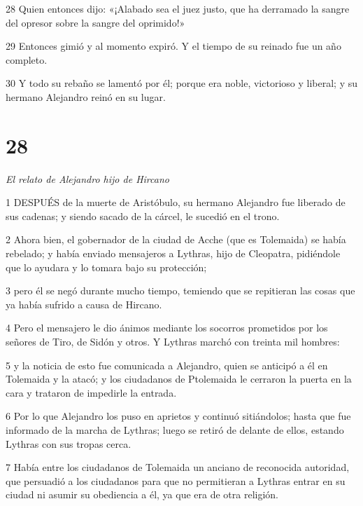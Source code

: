 \par 28 Quien entonces dijo: «¡Alabado sea el juez justo, que ha derramado la sangre del opresor sobre la sangre del oprimido!»

\par 29 Entonces gimió y al momento expiró. Y el tiempo de su reinado fue un año completo.

\par 30 Y todo su rebaño se lamentó por él; porque era noble, victorioso y liberal; y su hermano Alejandro reinó en su lugar.

\chapter{28}

\par \textit{El relato de Alejandro hijo de Hircano}

\par 1 DESPUÉS de la muerte de Aristóbulo, su hermano Alejandro fue liberado de sus cadenas; y siendo sacado de la cárcel, le sucedió en el trono.

\par 2 Ahora bien, el gobernador de la ciudad de Acche (que es Tolemaida) se había rebelado; y había enviado mensajeros a Lythras, hijo de Cleopatra, pidiéndole que lo ayudara y lo tomara bajo su protección;

\par 3 pero él se negó durante mucho tiempo, temiendo que se repitieran las cosas que ya había sufrido a causa de Hircano.

\par 4 Pero el mensajero le dio ánimos mediante los socorros prometidos por los señores de Tiro, de Sidón y otros. Y Lythras marchó con treinta mil hombres:

\par 5 y la noticia de esto fue comunicada a Alejandro, quien se anticipó a él en Tolemaida y la atacó; y los ciudadanos de Ptolemaida le cerraron la puerta en la cara y trataron de impedirle la entrada.

\par 6 Por lo que Alejandro los puso en aprietos y continuó sitiándolos; hasta que fue informado de la marcha de Lythras; luego se retiró de delante de ellos, estando Lythras con sus tropas cerca.

\par 7 Había entre los ciudadanos de Tolemaida un anciano de reconocida autoridad, que persuadió a los ciudadanos para que no permitieran a Lythras entrar en su ciudad ni asumir su obediencia a él, ya que era de otra religión.

